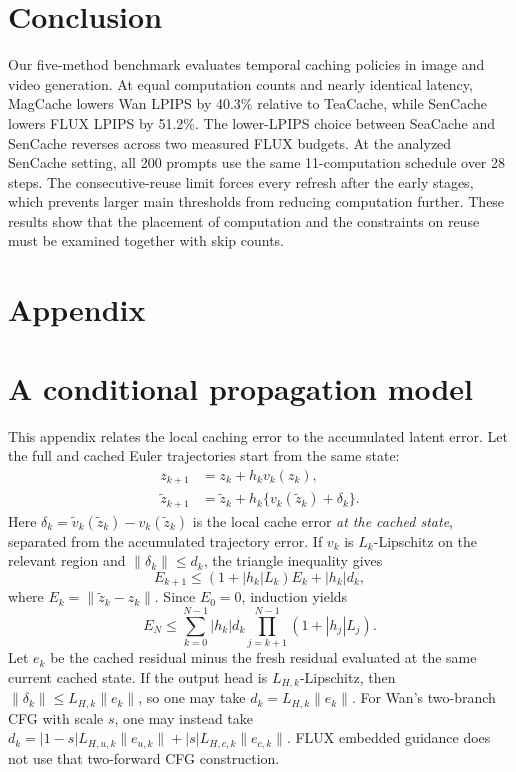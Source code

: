 \documentclass[10pt,twocolumn,letterpaper]{article}
\begin{document}
\section{Conclusion}
Our five-method benchmark evaluates temporal caching policies in image and video generation.
At equal computation counts and nearly identical latency, MagCache lowers Wan LPIPS by 40.3\% relative to TeaCache, while SenCache lowers FLUX LPIPS by 51.2\%.
The lower-LPIPS choice between SeaCache and SenCache reverses across two measured FLUX budgets.
At the analyzed SenCache setting, all 200 prompts use the same 11-computation schedule over 28 steps.
The consecutive-reuse limit forces every refresh after the early stages, which prevents larger main thresholds from reducing computation further.
These results show that the placement of computation and the constraints on reuse must be examined together with skip counts.

\clearpage
{
    \small
    
    
}

\clearpage
\appendix
\section*{Appendix}
\section{A conditional propagation model}
\label{app:propagation}
This appendix relates the local caching error to the accumulated latent error.
Let the full and cached Euler trajectories start from the same state:
\begin{align}
 z_{k+1}&=z_k+h_k v_k(z_k),\\
 \widetilde z_{k+1}&=\widetilde z_k+h_k\{v_k(\widetilde z_k)+\delta_k\}.
\end{align}
Here $\delta_k=\widetilde v_k(\widetilde z_k)-v_k(\widetilde z_k)$ is the local cache error \emph{at the cached state}, separated from the accumulated trajectory error.
If $v_k$ is $L_k$-Lipschitz on the relevant region and $\|\delta_k\|\le d_k$, the triangle inequality gives
\begin{equation}
E_{k+1}\le(1+|h_k|L_k)E_k+|h_k|d_k,
\end{equation}
where $E_k=\|\widetilde z_k-z_k\|$.
Since $E_0=0$, induction yields
\begin{equation}
E_N\le\sum_{k=0}^{N-1}|h_k|d_k\prod_{j=k+1}^{N-1}(1+|h_j|L_j).
\label{eq:prop}
\end{equation}
Let $e_k$ be the cached residual minus the fresh residual evaluated at the same current cached state.
If the output head is $L_{H,k}$-Lipschitz, then $\|\delta_k\|\le L_{H,k}\|e_k\|$, so one may take $d_k=L_{H,k}\|e_k\|$.
For Wan's two-branch CFG with scale $s$, one may instead take $d_k=|1-s|L_{H,u,k}\|e_{u,k}\|+|s|L_{H,c,k}\|e_{c,k}\|$.
FLUX embedded guidance does not use that two-forward CFG construction.
\end{document}
